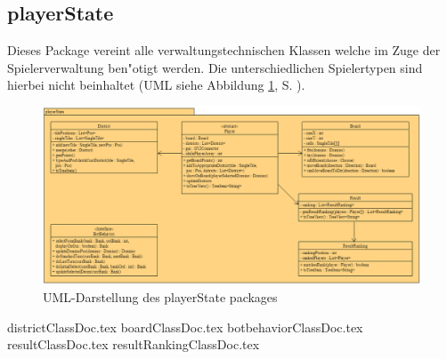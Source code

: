 \subsection{playerState}
\label{ss:playerState}
\FloatBarrier

Dieses Package vereint alle verwaltungstechnischen Klassen welche im Zuge der Spielerverwaltung ben"otigt werden. Die unterschiedlichen Spielertypen sind hierbei nicht beinhaltet (UML siehe Abbildung \ref{fig:playerStatePackage}, S. \pageref{fig:playerStatePackage}). 

\begin{figure}
	\centering
	\includegraphics[width=\linewidth]{pics/playerStatePackage}
	\caption{UML-Darstellung des playerState packages}
	\label{fig:playerStatePackage}
\end{figure}

{districtClassDoc.tex}
{boardClassDoc.tex}
{botbehaviorClassDoc.tex}
{resultClassDoc.tex}
{resultRankingClassDoc.tex}

